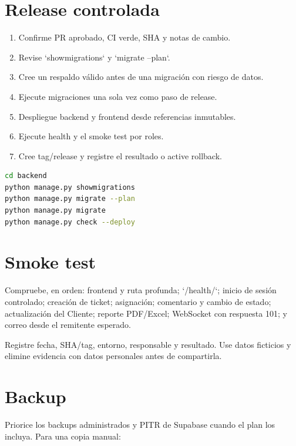 \section{Release controlada}

\begin{enumerate}
  \item Confirme PR aprobado, CI verde, SHA y notas de cambio.
  \item Revise `showmigrations` y `migrate --plan`.
  \item Cree un respaldo válido antes de una migración con riesgo de datos.
  \item Ejecute migraciones una sola vez como paso de release.
  \item Despliegue backend y frontend desde referencias inmutables.
  \item Ejecute health y el smoke test por roles.
  \item Cree tag/release y registre el resultado o active rollback.
\end{enumerate}

\begin{lstlisting}[language=bash]
cd backend
python manage.py showmigrations
python manage.py migrate --plan
python manage.py migrate
python manage.py check --deploy
\end{lstlisting}


\section{Smoke test}

Compruebe, en orden: frontend y ruta profunda; `/health/`; inicio de sesión controlado; creación de
ticket; asignación; comentario y cambio de estado; actualización del Cliente; reporte PDF/Excel;
WebSocket con respuesta 101; y correo desde el remitente esperado.

Registre fecha, SHA/tag, entorno, responsable y resultado. Use datos ficticios y elimine evidencia
con datos personales antes de compartirla.

\section{Backup}

Priorice los backups administrados y PITR de Supabase cuando el plan los incluya. Para una copia
manual:

